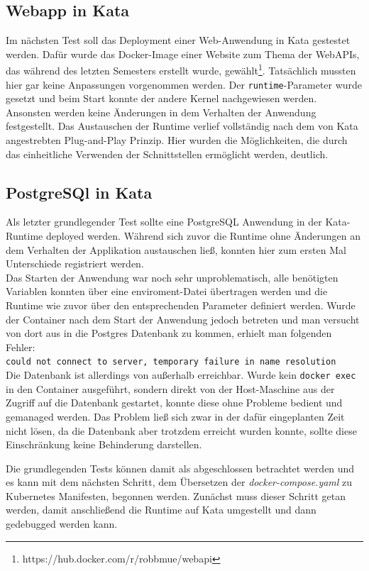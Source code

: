 \subsection{Webapp in Kata}
\label{ref:kata_plug_and_play}
Im nächsten Test soll das Deployment einer Web-Anwendung in Kata gestestet werden. 
Dafür wurde das Docker-Image einer Website zum Thema der Web\ac{API}s, das während des letzten Semesters erstellt wurde, gewählt\footnote{https://hub.docker.com/r/robbmue/webapi}. 
Tatsächlich mussten hier gar keine Anpassungen vorgenommen werden. 
Der \texttt{runtime}-Parameter wurde gesetzt und beim Start konnte der andere Kernel nachgewiesen werden.
Ansonsten werden keine Änderungen in dem Verhalten der Anwendung festgestellt. 
Das Austauschen der Runtime verlief vollständig nach dem von Kata angestrebten Plug-and-Play Prinzip.
Hier wurden die Möglichkeiten, die durch das einheitliche Verwenden der Schnittstellen ermöglicht werden, deutlich. 

\subsection{PostgreSQl in Kata}
\label{ref:postgres_kata}
Als letzter grundlegender Test sollte eine PostgreSQL Anwendung in der Kata-Runtime deployed werden. 
Während sich zuvor die Runtime ohne Änderungen an dem Verhalten der Applikation austauschen ließ, konnten hier zum ersten Mal Unterschiede registriert werden.
\\
Das Starten der Anwendung war noch sehr unproblematisch, alle benötigten Variablen konnten über eine enviroment-Datei übertragen werden und die Runtime wie zuvor über den entsprechenden Parameter definiert werden. 
Wurde der Container nach dem Start der Anwendung jedoch betreten und man versucht von dort aus in die Postgres Datenbank zu kommen, erhielt man folgenden Fehler:
\\\texttt{could not connect to server, temporary failure in name resolution}\\
Die Datenbank ist allerdings von außerhalb erreichbar.
Wurde kein \texttt{docker exec} in den Container ausgeführt, sondern direkt von der Host-Maschine aus der Zugriff auf die Datenbank gestartet, konnte diese ohne Probleme bedient und gemanaged werden. 
Das Problem ließ sich zwar in der dafür eingeplanten Zeit nicht lösen, da die Datenbank aber trotzdem erreicht wurden konnte, sollte diese Einschränkung keine Behinderung darstellen. 

Die grundlegenden Tests können damit als abgeschlossen betrachtet werden und es kann mit dem nächsten Schritt, dem Übersetzen der \textit{docker-compose.yaml} zu Kubernetes Manifesten, begonnen werden. 
Zunächst muss dieser Schritt getan werden, damit anschließend die Runtime auf Kata umgestellt und dann gedebugged werden kann. 


